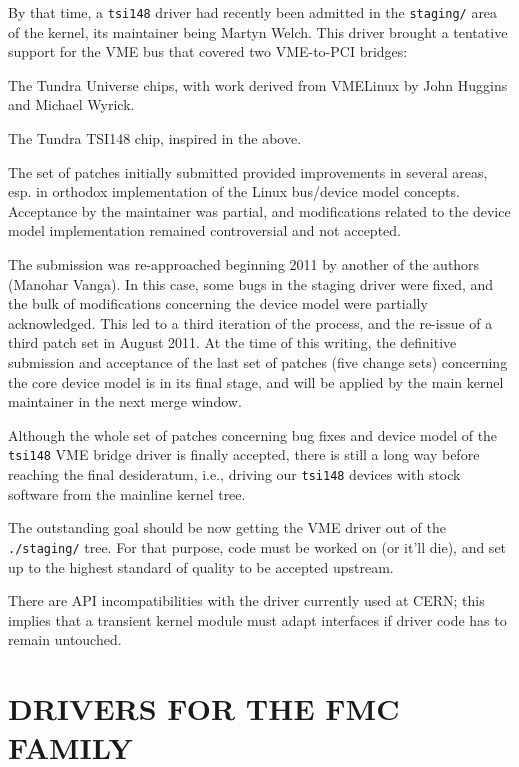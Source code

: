 \documentclass{JAC2003}
\begin{document}
By that time, a \verb|tsi148| driver had recently been admitted in
the \texttt{staging/} area of the kernel, its maintainer being Martyn
Welch. This driver brought a tentative support for the VME bus that covered
two VME-to-PCI bridges:
\begin{Itemize}
\item The Tundra Universe chips, with work derived from VMELinux by John
Huggins and Michael Wyrick.
\item The Tundra TSI148 chip, inspired in the above.
\end{Itemize}

The set of patches initially submitted provided improvements in several areas,
esp. in orthodox implementation of the Linux bus/device model concepts.
Acceptance by the maintainer was partial, and modifications related to the
device model implementation remained controversial and not accepted.

The submission was re-approached beginning 2011 by another of the authors
(Manohar Vanga). In this case, some bugs in the staging driver were fixed,
and the bulk of modifications concerning the device model were partially
acknowledged. This led to a third iteration of the process, and the
re-issue of a third patch set in August 2011. At the time of this writing,
the definitive submission and acceptance of the last set of patches (five
change sets) concerning the core device model is in its final stage, and will
be applied by the main kernel maintainer in the next merge window.

Although the whole set of patches concerning bug fixes and device model of the
\verb|tsi148| VME bridge driver is finally accepted, there is still a long
way before reaching the final desideratum, i.e., driving our \verb|tsi148|
devices with stock software from the mainline kernel tree.
\begin{Itemize}
\item The outstanding goal should be now getting the VME driver out of the
\verb|./staging/| tree. For that purpose, code must be worked on (or it'll
die), and set up to the highest standard of quality to be accepted upstream.
\item There are API  incompatibilities with the driver currently used at
CERN; this implies that a transient kernel module must adapt interfaces
if driver code has to remain untouched.
\end{Itemize}

\section{DRIVERS FOR THE FMC FAMILY}
\end{document}
